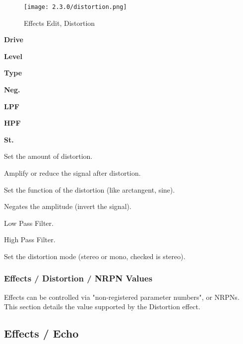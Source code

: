 \begin{figure}[H]
   \centering
   \texttt{[image: 2.3.0/distortion.png]}
   \caption{Effects Edit, Distortion}
   \label{fig:effects_edit_distortion}
\end{figure}

   \begin{enumber}
      \item \textbf{Drive}
      \item \textbf{Level}
      \item \textbf{Type}
      \item \textbf{Neg.}
      \item \textbf{LPF}
      \item \textbf{HPF}
      \item \textbf{St.}
   \end{enumber}

   \setcounter{ItemCounter}{0}      %

   Set the amount of distortion.

   Amplify or reduce the signal after distortion.

   Set the function of the distortion (like arctangent, sine).

   Negates the amplitude (invert the signal).

   Low Pass Filter.

   High Pass Filter.

   Set the distortion mode (stereo or mono, checked is stereo).

\subsubsection{Effects / Distortion / NRPN Values}
\label{subsubsec:effects_edit_distortion_nrpn}

   Effects can be controlled via "non-registered parameter numbers", or NRPNs.
   This section details the value supported by the Distortion effect.

\subsection{Effects / Echo}
\label{subsec:effects_edit_echo}

